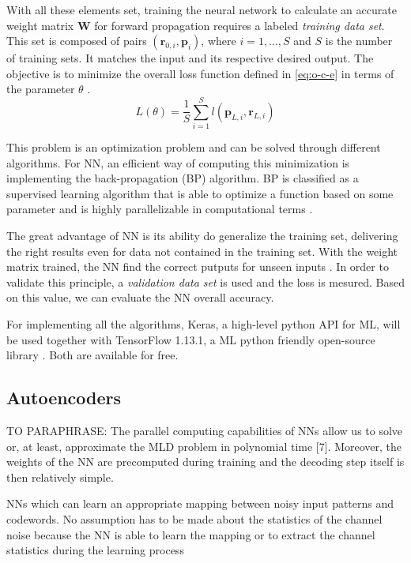 \documentclass[conference]{IEEEtran}
\begin{document}
With all these elements set, training the neural network to calculate an accurate weight matrix $\textbf{W}$ for forward propagation requires a labeled \textit{training data set}. This set is composed of pairs $ (\textbf{r}_{0,i}, \textbf{p}_i) $, where $i=1,...,S$ and $S$ is the number of training sets. It matches the input and its respective desired output. The objective is to minimize the overall loss function defined in \eqref{eq:o-c-e} in terms of the parameter $\theta$ \cite{b2}. 
\begin{equation}\label{eq:o-c-e}
L\left( \theta \right) =\dfrac {1}{S}\sum ^{S}_{i=1}l\left( \textbf{p}_{L,i},\textbf{r}_{L,i}\right)	
\end{equation}  

This problem is an optimization problem and can be solved through different algorithms. For NN, an efficient way of computing this minimization is implementing the back-propagation (BP) algorithm. 	BP is classified as a supervised learning algorithm that is able to optimize a function based on some parameter and is highly parallelizable in computational terms \cite{b8}\cite{b9}.

The great advantage of NN is its ability do generalize the training set, delivering the right results even for data not contained in the training set. With the weight matrix trained, the NN find the correct putputs for unseen inputs . In order to validate this principle, a \textit{validation data set} is used and the loss is mesured. Based on this value, we can evaluate the NN overall accuracy.

For implementing all the algorithms, Keras, a high-level python API for ML, will be used together with TensorFlow 1.13.1, a ML python friendly open-source library \cite{b11} \cite{b12}. Both are available for free.




\subsection{Autoencoders}
TO PARAPHRASE: The parallel computing
capabilities of NNs allow us to solve or, at least, approximate
the MLD problem in polynomial time [7]. Moreover, the
weights of the NN are precomputed during training and the
decoding step itself is then relatively simple. 

NNs which can learn an appropriate
mapping between noisy input patterns and codewords. No
assumption has to be made about the statistics of the channel
noise because the NN is able to learn the mapping or to
extract the channel statistics during the learning process
\end{document}
